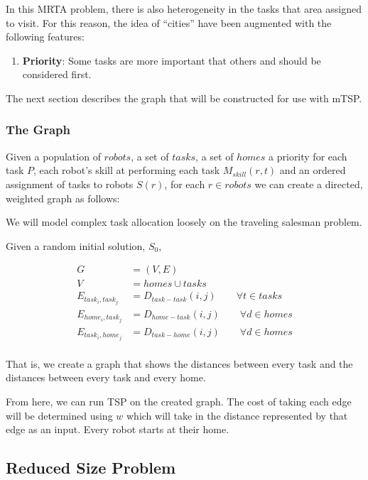 \documentclass[a4paper]{article}
\begin{document}
In this MRTA problem, there is also heterogeneity in the tasks that area assigned to visit. For this reason, the idea of ``cities'' have been augmented with the following features:

\begin{enumerate}
\item \textbf{Priority}: Some tasks are more important that others and should be considered first.
\end{enumerate}

The next section describes the graph that will be constructed for use with mTSP.

\subsubsection{The Graph}
Given a population of $\mathit{robots}$, a set of $\mathit{tasks}$, a set of $\mathit{homes}$ a priority for each task $P$, each robot's skill at performing each task $M_{skill}(r,t)$ and an ordered assignment of tasks to robots $S(r)$, for each $r \in \mathit{robots}$
we can create a directed, weighted graph as follows:

We will model complex task allocation loosely on the traveling salesman problem.

Given a random initial solution, $S_0$,

\begin{align*}
	G &= (V, E) \\
	V &= \mathit{homes} \cup \mathit{tasks} \\
	E_{task_i, task_j} &= D_\mathit{task-task}(i,j) \qquad \forall t \in \mathit{tasks} \\
  E_{home_i, task_j} &= D_\mathit{home-task}(i,j) \qquad \forall d \in \mathit{homes}\\
	E_{task_i, home_j} &= D_\mathit{task-home}(i,j) \qquad \forall d \in \mathit{homes}\\
\end{align*}
%

That is, we create a graph that shows the distances between every task and the distances between every task and every home.

From here, we can run TSP on the created graph. The cost of taking each edge will be determined using $w$ which will take in the distance represented by that edge as an input. Every robot starts at their home.

\subsection{Reduced Size Problem}
\end{document}

